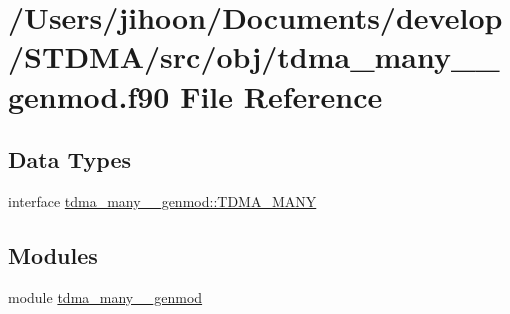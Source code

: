 \hypertarget{tdma__many____genmod_8f90}{}\section{/\+Users/jihoon/\+Documents/develop/\+S\+T\+D\+M\+A/src/obj/tdma\+\_\+many\+\_\+\+\_\+genmod.f90 File Reference}
\label{tdma__many____genmod_8f90}
\subsection*{Data Types}
\begin{DoxyCompactItemize}
\item 
interface \mbox{\hyperlink{interfacetdma__many____genmod_1_1_t_d_m_a___m_a_n_y}{tdma\+\_\+many\+\_\+\+\_\+genmod\+::\+T\+D\+M\+A\+\_\+\+M\+A\+NY}}
\end{DoxyCompactItemize}
\subsection*{Modules}
\begin{DoxyCompactItemize}
\item 
module \mbox{\hyperlink{namespacetdma__many____genmod}{tdma\+\_\+many\+\_\+\+\_\+genmod}}
\end{DoxyCompactItemize}
